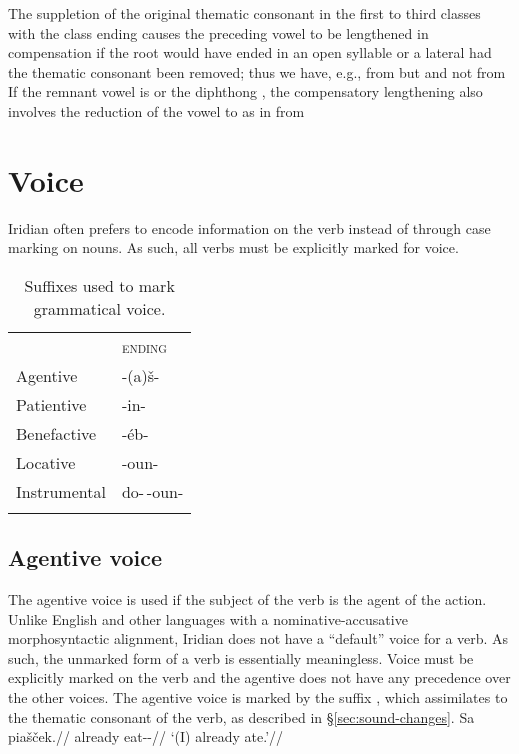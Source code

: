 The suppletion of the original thematic consonant in the first to third classes
with the class ending causes the preceding vowel to be lengthened in
compensation if the root would have ended in an open syllable or a lateral had
the thematic consonant been removed; thus we have, e.g.,  from
 but  and not
 from  If the remnant vowel
is  or the diphthong , the compensatory lengthening also involves
the reduction of the vowel to  as in  from

\section{Voice}\label{sec:voice}

Iridian often prefers to encode information on the verb instead of through case
marking on nouns. As such, all verbs must be explicitly marked for voice.

\begin{table}
	\sffamily\footnotesize
	\caption{Suffixes used to mark grammatical voice.}\medskip
	\begin{tabu} to 0.5
		\toprule \addlinespace
		&{\scshape ending}\\ \addlinespace
		\midrule \addlinespace
		Agentive	& {-(a)š-}\\ \addlinespace
		Patientive	& {-in-}\\  \addlinespace
		Benefactive	& {-éb-}\\ \addlinespace
		Locative	& {-oun-}\\ \addlinespace
		Instrumental& {do-\,-oun-}\\ \addlinespace
		\bottomrule
	\end{tabu}
\end{table}

\subsection{Agentive voice}

The agentive voice is used if the subject of the verb is the agent of the
action. Unlike English and other languages with a nominative-accusative
morphosyntactic alignment, Iridian does not have a ``default'' voice for a verb.
As such, the unmarked form of a verb is essentially meaningless. Voice must be
explicitly marked on the verb and the agentive does not have any precedence over
the other voices. The agentive voice is marked by the suffix , which
assimilates to the thematic consonant of the verb, as described in
\S\ref{sec:sound-changes}.
\pex
\begingl
\gla Sa piašček.//
\glb already eat-\Av{}-\Pf{}//
\glft `(I) already ate.'//
\endgl
\xe

